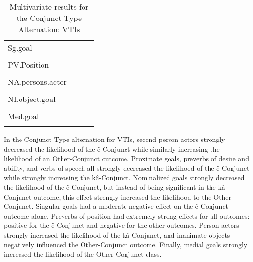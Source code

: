 \begin{table}[H]
\begin{tabular}{llll}
Sg.goal                & \cellcolor[HTML]{EA9999}{-0.479}      &                                  &        \\
                       & \cellcolor[HTML]{EA9999}{(0.015)}     &                                  &        \\
PV.Position            & \cellcolor[HTML]{B6D7A8}{2.362}       & \cellcolor[HTML]{EA9999}{-2.19}  & \cellcolor[HTML]{EA9999}{-2.203} \\
                       & \cellcolor[HTML]{B6D7A8}{(0.002)}     & \cellcolor[HTML]{EA9999}{(0.035)}                          & \cellcolor[HTML]{EA9999}{(0.045)}  \\
NA.persons.actor       &                                       & \cellcolor[HTML]{B6D7A8}{0.791}  &        \\
                       &                                       & \cellcolor[HTML]{B6D7A8}{(0.002)}                          &        \\
NI.object.goal         &                                       &                                  & \cellcolor[HTML]{EA9999}{-0.988} \\
                       &                                       &                                  & \cellcolor[HTML]{EA9999}{(0.004)}  \\
Med.goal               &                                       &                                  & \cellcolor[HTML]{B6D7A8}{0.983}  \\
                       &                                       &                                  & \cellcolor[HTML]{B6D7A8}{(0.014)}  \\
          \bottomrule
                    \end{tabular}
                    \caption{
                       Multivariate results for the Conjunct Type Alternation: VTIs \\ \label{tab:tiecnjall}
                      }
                    \end{table}
        
        In the Conjunct Type alternation for VTIs, second person actors strongly decreased the likelihood of the ê-Conjunct while similarly increasing the likelihood of an Other-Conjunct outcome. Proximate goals, preverbs of desire and ability, and verbs of speech all strongly decreased the likelihood of the ê-Conjunct while strongly increasing the kâ-Conjunct. Nominalized goals strongly decreased the likelihood of the ê-Conjunct, but instead of being significant in the kâ-Conjunct outcome, this effect strongly increased the likelihood to the Other-Conjunct. Singular goals had a moderate negative effect on the ê-Conjunct outcome alone. Preverbs of position had extremely strong effects for all outcomes: positive for the ê-Conjunct and negative for the other outcomes. Person actors strongly increased the likelihood of the kâ-Conjunct, and inanimate objects negatively influenced the Other-Conjunct outcome. Finally, medial goals strongly increased the likelihood of the Other-Conjunct class. 

